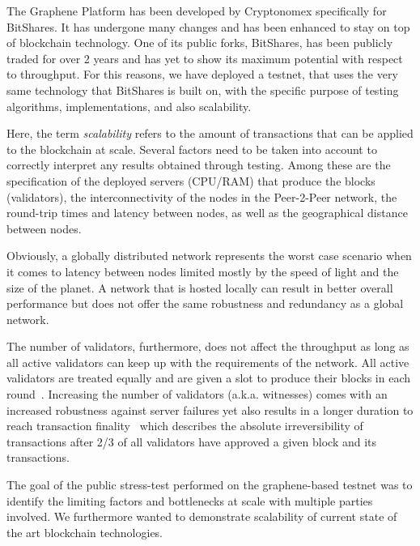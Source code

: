 The Graphene Platform has been developed by Cryptonomex specifically for
BitShares. It has undergone many changes and has been enhanced to stay on top of
blockchain technology. One of its public forks, BitShares, has been publicly traded
for over 2 years and has yet to show its maximum potential with respect to throughput.
For this reasons, we have deployed a testnet, that uses the very same technology that BitShares is built
on, with the specific purpose of testing algorithms, implementations, and also scalability.

Here, the term \emph{scalability} refers to the amount of transactions that can
be applied to the blockchain at scale. Several factors need to be taken into
account to correctly interpret any results obtained through testing. Among
these are the specification of the deployed servers (CPU/RAM) that produce the
blocks (validators), the interconnectivity of the nodes in the Peer-2-Peer
network, the round-trip times and latency between nodes, as well as the
geographical distance between nodes.

Obviously, a globally distributed network represents the worst case scenario
when it comes to latency between nodes limited mostly by the speed of light and
the size of the planet. A network that is hosted locally can result in better
overall performance but does not offer the same robustness and redundancy as a
global network.

The number of validators, furthermore, does not affect the throughput as long
as all active validators can keep up with the requirements of the network. All
active validators are treated equally and are given a slot to produce their
blocks in each round~\cite{bts:general}. Increasing the number of validators
(a.k.a. witnesses) comes with an increased robustness against server failures
yet also results in a longer duration to reach transaction
finality~\cite{bts:general} which describes the absolute irreversibility of
transactions after 2/3 of all validators have approved a given block and its
transactions.

The goal of the public stress-test performed on the graphene-based testnet was
to identify the limiting factors and bottlenecks at scale with multiple parties
involved. We furthermore wanted to demonstrate scalability of current state of
the art blockchain technologies.
